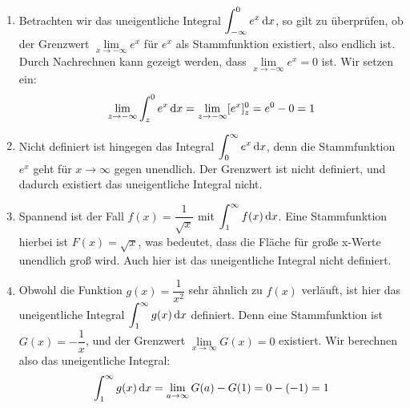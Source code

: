 \documentclass[ngerman, 12pt]{nssheetxea}
\begin{document}
\begin{example} \
\begin{enumerate}
\item Betrachten wir das uneigentliche Integral $\displaystyle \int_{-\infty}^0 e^x \mathop{}\!\mathrm{d} x$, so gilt zu überprüfen, ob der Grenzwert $\lim\limits_{x\to - \infty} e^x$ für $e^x$ als Stammfunktion existiert, also endlich ist. Durch Nachrechnen kann gezeigt werden, dass $\lim\limits_{x\to - \infty} e^x = 0$ ist. Wir setzen ein:
\[ \lim_{z\to -\infty} \int_z^0 e^x \mathop{}\!\mathrm{d} x = \lim_{z\to -\infty} [e^x]_z^0 = e^0 - 0 = 1\]
\item Nicht definiert ist hingegen das Integral $\displaystyle \int_0^\infty e^x \mathop{}\!\mathrm{d} x$, denn die Stammfunktion $e^x$ geht für $x\to \infty$ gegen unendlich. Der Grenzwert ist nicht definiert, und dadurch existiert das uneigentliche Integral nicht.
\item Spannend ist der Fall $f(x)=\dfrac{1}{\sqrt{x}}$ mit $\displaystyle \int_1^\infty f(x) \mathop{}\!\mathrm{d} x$. Eine Stammfunktion hierbei ist $F(x)=\sqrt{x}$, was bedeutet, dass die Fläche für große x-Werte unendlich groß wird. Auch hier ist das uneigentliche Integral nicht definiert.
\item Obwohl die Funktion $g(x)=\dfrac{1}{x^2}$ sehr ähnlich zu $f(x)$ verläuft, ist hier das uneigentliche Integral $\displaystyle \int_{1}^\infty g(x) \mathop{}\!\mathrm{d} x$ definiert. Denn eine Stammfunktion ist $G(x)=-\dfrac{1}{x}$, und der Grenzwert $\lim\limits_{x\to \infty}G(x)=0$ existiert. Wir berechnen also das uneigentliche Integral:
\[ \int_1^\infty g(x) \mathop{}\!\mathrm{d} x = \lim_{a\to\infty} G(a)-G(1)=0- (-1)=1\]
\begin{center}
\end{center}

\end{enumerate}
\end{example}
\end{document}
